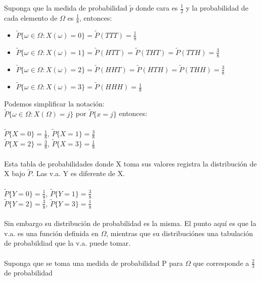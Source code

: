 \documentclass{article}
\begin{document}
        Suponga que la medida de probabilidad $\tilde{p}$
        donde cara es $\frac{1}{2}$ y la probabilidad de cada elemento de 
        $\Omega$ es $\frac{1}{8}$, entonces:
        \begin{itemize}
            \item $\tilde{P} \lbrace \omega \in \Omega : X(\omega)=0 \rbrace = \tilde{P}(TTT) = \frac{1}{8}$
            \item $\tilde{P} \lbrace \omega \in \Omega : X(\omega)=1 \rbrace = \tilde{P}(HTT) = \tilde{P}(THT) = \tilde{P}(TTH) = \frac{3}{8}$
            \item $\tilde{P} \lbrace \omega \in \Omega : X(\omega)=2 \rbrace = \tilde{P}(HHT) = \tilde{P}(HTH) = \tilde{P}(THH) = \frac{3}{8}$
            \item $\tilde{P} \lbrace \omega \in \Omega : X(\omega)=3 \rbrace = \tilde{P}(HHH) = \frac{1}{8}$
        \end{itemize}
        Podemos simplificar la notación:
        \\
        $\tilde{P} \lbrace \omega \in \Omega : X(\Omega) = j \rbrace$ por $\tilde{P} \lbrace x=j \rbrace$ entonces:
        \\
        \\
        $\tilde{P} \lbrace X=0 \rbrace = \frac{1}{8}$, $\tilde{P} \lbrace X=1 \rbrace = \frac{3}{8}$
        \\
        $\tilde{P} \lbrace X=2 \rbrace = \frac{3}{8}$, $\tilde{P} \lbrace X=3 \rbrace = \frac{1}{8}$
        \\
        \\
        Esta tabla de probabilidades donde X toma sus valores registra la distribución de X bajo $\tilde{P}$.
        Las v.a.  Y es diferente de X.
        \\
        \\
        $\tilde{P} \lbrace Y=0 \rbrace = \frac{1}{8}$, $\tilde{P} \lbrace Y=1 \rbrace = \frac{3}{8}$
        \\
        $\tilde{P} \lbrace Y=2 \rbrace = \frac{3}{8}$, $\tilde{P} \lbrace Y=3 \rbrace = \frac{1}{8}$
        \\
        \\
        Sin embargo su distribución de probabilidad es la misma.
        El punto aquí es que la v.a. es una función definida en $\Omega$, mientras que su distribuciónes una tabulación de probabildiad que la v.a. puede tomar.
        \\
        \\
        Suponga que se toma una medida de probabilidad P para $\Omega$ que corresponde a $\frac{2}{3}$ de probabilidad
\end{document}
